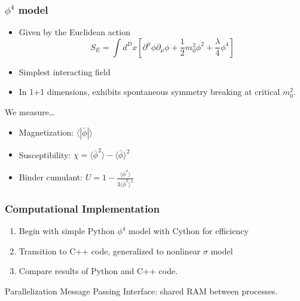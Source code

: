 \documentclass{beamer}
\begin{document}
\begin{frame}
    \frametitle{$\phi^4$ model}
    \begin{itemize}
        \item Given by the Euclidean action
            \begin{equation}
                S_E = \int d^D x \left[ \partial^\mu \phi \partial_\mu\phi + \frac{1}{2} m_0^2 \phi^2 + \frac{\lambda}{4}\phi^4\right]
            \end{equation} 

        \item Simplest interacting field
        \item In 1+1 dimensions, exhibits spontaneous symmetry breaking at critical $m_0^2$.


    \end{itemize}

    We measure\ldots
\begin{itemize}
    \item Magnetization: $\langle |\bar\phi|\rangle$
    \item Susceptibility: $\chi = \langle {\bar\phi}^2\rangle - \langle\bar\phi\rangle^2$
    \item Binder cumulant: $U = 1 - \frac{\langle {\bar\phi}^4\rangle}{3 \langle {\bar\phi}^2\rangle^2}$
\end{itemize}
\end{frame}

\begin{frame}
    \frametitle{Computational Implementation}
    \begin{enumerate}
        \item Begin with simple Python $\phi^4$ model with Cython for efficiency
        \item Transition to C++ code, generalized to nonlinear $\sigma$ model
        \item Compare results of Python and C++ code.
    \end{enumerate}
    \begin{block}{Parallelization}
        Message Passing Interface: shared RAM between processes.
    \end{block}
\end{frame}
\end{document}
